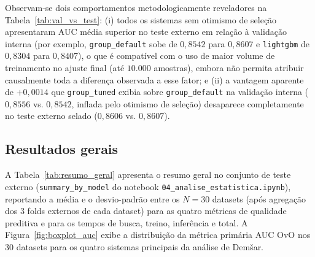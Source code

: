 \documentclass[11pt,a4paper]{article}
\begin{document}
Observam-se dois comportamentos metodologicamente reveladores na Tabela~\ref{tab:val_vs_test}: (i) todos os sistemas sem otimismo de seleção apresentaram AUC média superior no teste externo em relação à validação interna (por exemplo, \texttt{group\_default} sobe de $0{,}8542$ para $0{,}8607$ e \texttt{lightgbm} de $0{,}8304$ para $0{,}8407$), o que é compatível com o uso de maior volume de treinamento no ajuste final (até $10.000$ amostras), embora não permita atribuir causalmente toda a diferença observada a esse fator; e (ii) a vantagem aparente de $+0{,}0014$ que \texttt{group\_tuned} exibia sobre \texttt{group\_default} na validação interna ($0{,}8556$ vs. $0{,}8542$, inflada pelo otimismo de seleção) desaparece completamente no teste externo selado ($0{,}8606$ vs. $0{,}8607$).

\subsection{Resultados gerais}
\label{sec:resultados_gerais}

A Tabela~\ref{tab:resumo_geral} apresenta o resumo geral no conjunto de teste externo (\texttt{summary\_by\_model} do notebook \texttt{04\_analise\_estatistica.ipynb}), reportando a média e o desvio-padrão entre os $N = 30$ datasets (após agregação dos 3 folds externos de cada dataset) para as quatro métricas de qualidade preditiva e para os tempos de busca, treino, inferência e total. A Figura~\ref{fig:boxplot_auc} exibe a distribuição da métrica primária AUC OvO nos 30 datasets para os quatro sistemas principais da análise de Demšar.
\end{document}
